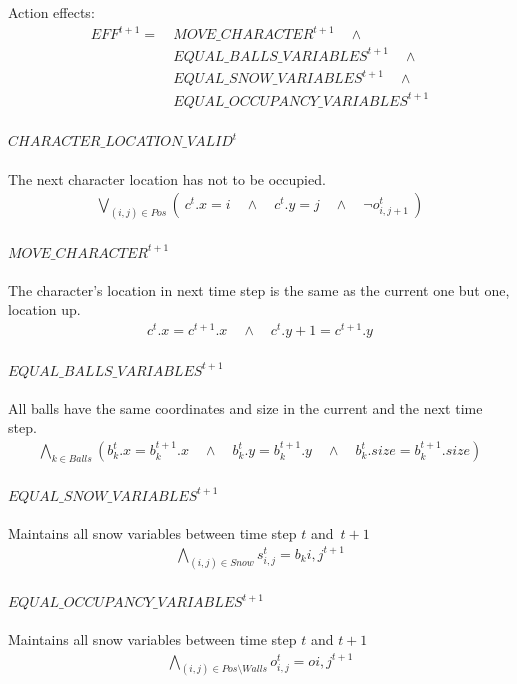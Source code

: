 \documentclass{report}
\theoremstyle{plain}
\begin{document}
Action effects:
\begin{align*}
EFF^{t+1} = \ & MOVE\_CHARACTER^{t+1} \quad \wedge \\
& EQUAL\_BALLS\_VARIABLES^{t+1} \quad \wedge \\
& EQUAL\_SNOW\_VARIABLES^{t+1} \quad \wedge \\
& EQUAL\_OCCUPANCY\_VARIABLES^{t+1}
\end{align*}

\paragraph{$CHARACTER\_LOCATION\_VALID^t$}
The next character location has not to be occupied.
\begin{align*}
\bigvee \limits_{(i, j)\in Pos} (\ c^t.x = i \quad \wedge \quad c^t.y = j \quad \wedge \quad \lnot o_{i,j + 1}^t\ )
\end{align*}

\paragraph{$MOVE\_CHARACTER^{t+1}$}
The character's location in next time step is the same as the current one but one, location up.
\begin{align*}
c^t.x = c^{t+1}.x\quad \wedge\quad c^t.y + 1 = c^{t+1}.y
\end{align*}

\paragraph{$EQUAL\_BALLS\_VARIABLES^{t+1}$}
All balls have the same coordinates and size in the current and the next time step.
\begin{align*}
\bigwedge \limits_{k \in Balls} (b_k^t.x = b_k^{t+1}.x \quad \wedge \quad b_k^t.y = b_k^{t+1}.y \quad \wedge \quad b_k^t.size = b_k^{t+1}.size)
\end{align*}

\paragraph{$EQUAL\_SNOW\_VARIABLES^{t+1}$}
Maintains all snow variables between time step $t$ and~$t+1$
\begin{align*}
\bigwedge \limits_{(i, j) \in Snow} s_{i,j}^t = b_k{i,j}^{t+1}
\end{align*}

\paragraph{$EQUAL\_OCCUPANCY\_VARIABLES^{t+1}$}
Maintains all snow variables between time step $t$ and $t+1$
\begin{align*}
\bigwedge \limits_{(i, j) \in Pos \setminus Walls} o_{i,j}^t = o{i,j}^{t+1}
\end{align*}
\end{document}

